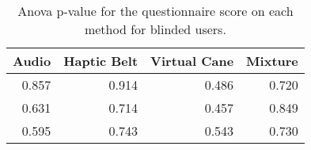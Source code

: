 
\begin{table}[!htb]
\centering
\caption{Anova p-value for the questionnaire score on each method for blinded users.}
\label{tab:anova_sagat}
\begin{tabular}{rrrr}
\toprule
 Audio &  Haptic Belt &  Virtual Cane &  Mixture \\
\midrule
 0.857 &        0.914 &         0.486 &    0.720 \\
 0.631 &        0.714 &         0.457 &    0.849 \\
 0.595 &        0.743 &         0.543 &    0.730 \\
\bottomrule
\end{tabular}
\end{table}

